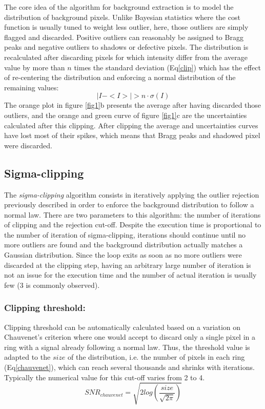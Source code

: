 \documentclass[preprint]{iucr}              %
\begin{document}
The core idea of the algorithm for background extraction is to model the distribution of background pixels. Unlike Bayesian statistics \cite{Sivia2006} where the cost function is usually tuned to weight less outlier, here, those outliers are simply flagged and discarded.
Positive outliers can reasonably be assigned to Bragg peaks and negative outliers to shadows or defective pixels. 
The distribution is recalculated  after discarding pixels for which intensity differ from the average value by more than $n$ times the standard deviation (Eq\ref{clip}) which has the effect of re-centering the distribution and enforcing a normal distribution of the remaining values:
\begin{equation}
\label{clip}
|I - <I>| > n \cdot \sigma(I)
\end{equation}
The orange plot in figure \ref{fig1}b presents the average after having discarded those outliers, and the orange and green curve of figure \ref{fig1}c are the uncertainties calculated after this clipping. 
 After clipping the average and uncertainties curves have lost most of their spikes, which means that Bragg peaks and shadowed pixel were discarded.
 
\subsection{Sigma-clipping}
The \textit{sigma-clipping} algorithm consists in iteratively applying the outlier rejection previously described in order to enforce the background distribution to follow a normal law.
There are two parameters to this algorithm: the number of iterations of clipping and the rejection cut-off.
Despite the execution time is proportional to the number of iteration of sigma-clipping, iterations should continue until no more outliers are found and the 
background distribution actually matches a Gaussian distribution. 
Since the loop exits as soon as no more outliers were discarded at the clipping step, having an arbitrary large number of iteration is not an issue for the execution time and the number of actual iteration is usually few (3 is commonly observed).       

\subsubsection{Clipping threshold:}
Clipping threshold can be automatically calculated based on a variation on Chauvenet's criterion \cite{chauvenet} where one would accept to discard only a single pixel in a ring with a signal already following a normal law. 
Thus, the threshold value is adapted to the $size$ of the distribution, i.e. the number of pixels in each ring (Eq\ref{chauvenet}), which can reach several thousands and shrinks with iterations.
Typically the numerical value for this cut-off varies from 2 to 4.   
\begin{equation}
\label{chauvenet}
SNR_{chauvenet} =  \sqrt{2 log(\frac{size}{\sqrt{2 \pi}})}
\end{equation}
\end{document}
